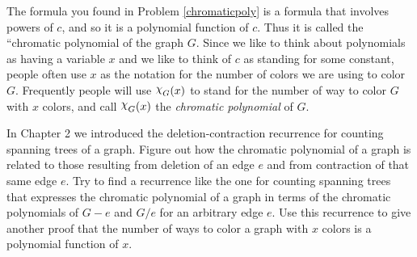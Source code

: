 \ep

The formula you found in Problem \ref{chromaticpoly} is a formula that
involves powers of $c$, and so it is a polynomial function of $c$. Thus
it is called the ``chromatic polynomial of the graph
$G$.    Since we like to think about polynomials as having a
variable $x$ and we like to think of $c$ as standing for some constant,
people often use $x$ as the notation for the number of colors we are
using to color $G$. Frequently people will use
$\Chi_G(x)$ to stand for the number of way to color
$G$ with $x$ colors, and call $\Chi_G(x)$ the {\em chromatic polynomial} of
$G$.  

\bp

\itemi In Chapter 2 we introduced the deletion-contraction
recurrence for counting spanning
trees of a graph.  Figure out how the chromatic polynomial of a graph is
related to those resulting from deletion of an edge $e$ and from
contraction of that same edge $e$.  Try to find a recurrence like the one
for counting spanning trees that expresses the chromatic polynomial of a
graph in terms of the chromatic polynomials of $G-e$ and $G/e$ for an
arbitrary edge $e$.  Use this recurrence to give another proof that the
number of ways to color a graph with $x$ colors is a polynomial function
of $x$.  \label{chrompolydel/cont}



